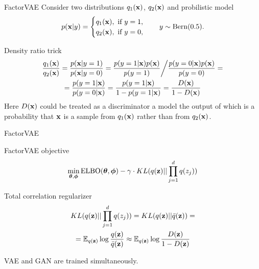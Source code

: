 \documentclass{beamer}
\begin{document}
\begin{frame}{FactorVAE}
	Consider two distributions $q_1(\mathbf{x})$, $q_2(\mathbf{x})$ and probilistic model
	\[
		p(\mathbf{x} | y) = \begin{cases}
			q_1(\mathbf{x}), \text{ if } y = 1, \\
			q_2(\mathbf{x}), \text{ if } y = 0,
		\end{cases}
		\quad 
		y \sim \text{Bern}(0.5).
	\]
	\begin{block}{Density ratio trick}
		\vspace{-0.5cm}
		\begin{multline*}
			\frac{q_1(\mathbf{x})}{q_2(\mathbf{x})} = \frac{p(\mathbf{x} | y = 1)}{p(\mathbf{x} | y = 0)} = \frac{p(y = 1 | \mathbf{x}) p(\mathbf{x})}{p(y=1)} \bigg/ \frac{p(y = 0 | \mathbf{x}) p(\mathbf{x})}{p(y=0)} = \\
			= \frac{p(y = 1 | \mathbf{x})}{p(y = 0 | \mathbf{x})} = \frac{p(y = 1 | \mathbf{x})}{1 - p(y = 1 | \mathbf{x})} = \frac{D(\mathbf{x})}{1 - D(\mathbf{x})}
		\end{multline*}
	Here $D(\mathbf{x})$ could be treated as a discriminator a model the output of which is a probability that $\mathbf{x}$ is a sample
	from $q_1(\mathbf{x})$ rather than from $q_2(\mathbf{x})$.
	\end{block}

\end{frame}
\begin{frame}{FactorVAE}
	
	\begin{block}{FactorVAE objective}
		\vspace{-0.3cm}
		\[
		\min_{\boldsymbol{\theta}, \boldsymbol{\phi}} \text{ELBO}(\boldsymbol{\theta}, \boldsymbol{\phi}) - \gamma \cdot KL(q(\mathbf{z}) || \prod_{j=1}^d q(z_j))
		\]
		\vspace{-0.3cm}
	\end{block}
	
	\begin{block}{Total correlation regularizer}
		\vspace{-0.7cm}
		\begin{multline*}
		KL(q(\mathbf{z}) || \prod_{j=1}^d q(z_j)) = KL(q(\mathbf{z}) || \bar{q}(\mathbf{z})) = \\ =\mathbb{E}_{q(\mathbf{z})} \log \frac{q(\mathbf{z})}{\bar{q}(\mathbf{z})} \approx \mathbb{E}_{q(\mathbf{z})} \log \frac{D(\mathbf{z})}{1 - D(\mathbf{z})}
		\end{multline*}
		\vspace{-0.3cm}
	\end{block}
	VAE and GAN are trained simultaneously.

\end{frame}
\end{document}
